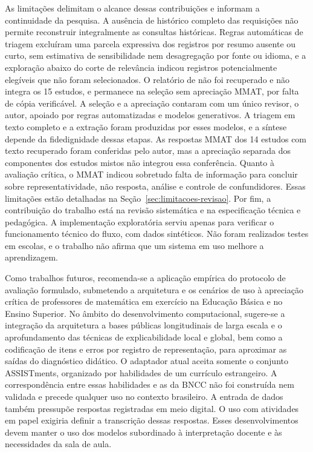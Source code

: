 As limitações delimitam o alcance dessas contribuições e informam a continuidade da pesquisa. A ausência de histórico completo das requisições não permite reconstruir integralmente as consultas históricas. Regras automáticas de triagem excluíram uma parcela expressiva dos registros por resumo ausente ou curto, sem estimativa de sensibilidade nem desagregação por fonte ou idioma, e a exploração abaixo do corte de relevância indicou registros potencialmente elegíveis que não foram selecionados. O relatório de  não foi recuperado e não integra os 15 estudos, e  permanece na seleção sem apreciação MMAT, por falta de cópia verificável. A seleção e a apreciação contaram com um único revisor, o autor, apoiado por regras automatizadas e modelos generativos. A triagem em texto completo e a extração foram produzidas por esses modelos, e a síntese depende da fidedignidade dessas etapas. As respostas MMAT dos 14 estudos com texto recuperado foram conferidas pelo autor, mas a apreciação separada dos componentes dos estudos mistos não integrou essa conferência. Quanto à avaliação crítica, o MMAT indicou sobretudo falta de informação para concluir sobre representatividade, não resposta, análise e controle de confundidores. Essas limitações estão detalhadas na Seção~\ref{sec:limitacoes-revisao}. Por fim, a contribuição do trabalho está na revisão sistemática e na especificação técnica e pedagógica. A implementação exploratória serviu apenas para verificar o funcionamento técnico do fluxo, com dados sintéticos. Não foram realizados testes em escolas, e o trabalho não afirma que um sistema em uso melhore a aprendizagem.

Como trabalhos futuros, recomenda-se a aplicação empírica do protocolo de avaliação formulado, submetendo a arquitetura e os cenários de uso à apreciação crítica de professores de matemática em exercício na Educação Básica e no Ensino Superior. No âmbito do desenvolvimento computacional, sugere-se a integração da arquitetura a bases públicas longitudinais de larga escala e o aprofundamento das técnicas de explicabilidade local e global, bem como a codificação de itens e erros por registro de representação, para aproximar as saídas do diagnóstico didático. O adaptador atual aceita somente o conjunto ASSISTments, organizado por habilidades de um currículo estrangeiro. A correspondência entre essas habilidades e as da BNCC não foi construída nem validada e precede qualquer uso no contexto brasileiro. A entrada de dados também pressupõe respostas registradas em meio digital. O uso com atividades em papel exigiria definir a transcrição dessas respostas. Esses desenvolvimentos devem manter o uso dos modelos subordinado à interpretação docente e às necessidades da sala de aula.

